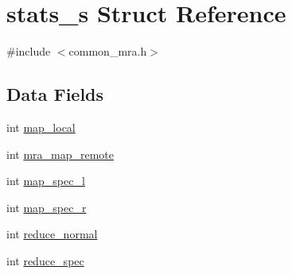 \hypertarget{structstats__s}{\section{stats\-\_\-s \-Struct \-Reference}
\label{structstats__s}
}


{\ttfamily \#include $<$common\-\_\-mra.\-h$>$}

\subsection*{\-Data \-Fields}
\begin{DoxyCompactItemize}
\item 
int \hyperlink{structstats__s_ac3b2752238687f8f231dc7ee3fb66126}{map\-\_\-local}
\item 
int \hyperlink{structstats__s_ae49231fe6e7f535421d0b0cc63af8324}{mra\-\_\-map\-\_\-remote}
\item 
int \hyperlink{structstats__s_a8928364ec78465521407e3978bb0256b}{map\-\_\-spec\-\_\-l}
\item 
int \hyperlink{structstats__s_aaa36a987438e3743fb4fddf2e3b766ac}{map\-\_\-spec\-\_\-r}
\item 
int \hyperlink{structstats__s_ac416c784bd8cc7f6ff36fc0424a3e3bc}{reduce\-\_\-normal}
\item 
int \hyperlink{structstats__s_a72a455323e2db452773d6e4d21fe8554}{reduce\-\_\-spec}
\end{DoxyCompactItemize}


